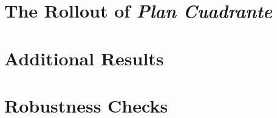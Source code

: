 \documentclass[11pt,english, letter, amsmath]{article}
\begin{document}
\onehalfspacing
\appendix

\tableofcontents
\newpage

\clearpage
\section{The Rollout of \emph{Plan Cuadrante}} \label{sec:appendixA}

\setcounter{figure}{0}
\renewcommand{\thefigure}{\Alph{section}\arabic{figure}}
\setcounter{table}{0}
\renewcommand{\thetable}{\Alph{section}\arabic{table}}



\clearpage
\section{Additional Results} \label{sec:appendixB}

\setcounter{figure}{0}
\renewcommand{\thefigure}{\Alph{section}\arabic{figure}}
\setcounter{table}{0}
\renewcommand{\thetable}{\Alph{section}\arabic{table}}



\clearpage

\section{Robustness Checks} \label{sec:appendixC}
\setcounter{figure}{0}
\renewcommand{\thefigure}{\Alph{section}\arabic{figure}}
\setcounter{table}{0}
\renewcommand{\thetable}{\Alph{section}\arabic{table}}



\FloatBarrier
\end{document}
